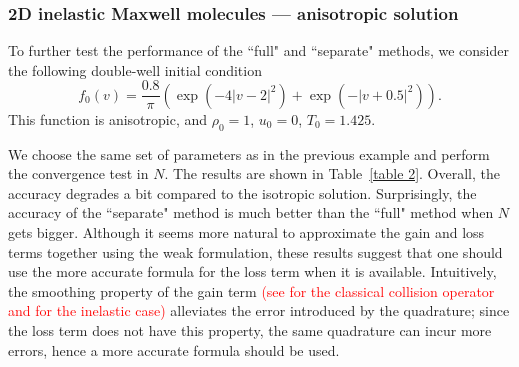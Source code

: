 \documentclass[review,times]{elsarticle}
\begin{document}
\subsubsection{2D inelastic Maxwell molecules --- anisotropic solution}

To further test the performance of the ``full" and ``separate" methods, we consider the following double-well initial condition
\begin{equation}
  f_0(v) = \frac{0.8}{\pi}\left(\exp(-4|v-2|^2) + \exp(-|v+0.5|^2)\right).
\end{equation}
This function is anisotropic, and $\rho_0=1$, $u_0=0$, $T_0=1.425$.

We choose the same set of parameters as in the previous example and perform the convergence test in $N$. The results are shown in Table~\ref{table 2}. Overall, the accuracy degrades a bit compared to the isotropic solution. Surprisingly, the accuracy of the ``separate" method is much better than the ``full" method when $N$ gets bigger. Although it seems more natural to approximate the gain and loss terms together using the weak formulation, these results suggest that one should use the more accurate formula for the loss term when it is available. Intuitively, the smoothing property of the gain term \textcolor{red}{(see \cite{Lions94} for the classical collision operator and \cite{MM06} for the inelastic case)} alleviates the error introduced by the quadrature; since the loss term does not have this property, the same quadrature can incur more errors, hence a more accurate formula should be used.
\end{document}
